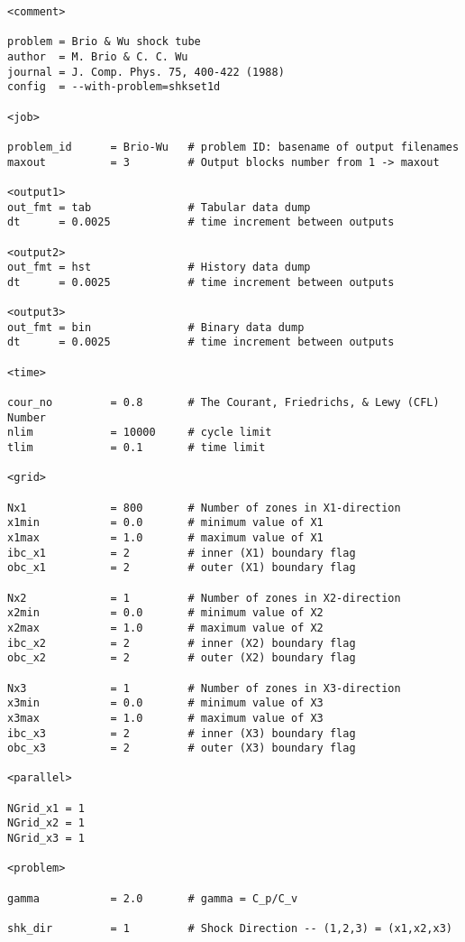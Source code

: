 \footnotesize
\begin{verbatim}
<comment>

problem = Brio & Wu shock tube
author  = M. Brio & C. C. Wu 
journal = J. Comp. Phys. 75, 400-422 (1988)
config  = --with-problem=shkset1d

<job>

problem_id      = Brio-Wu   # problem ID: basename of output filenames
maxout          = 3         # Output blocks number from 1 -> maxout

<output1>
out_fmt = tab               # Tabular data dump
dt      = 0.0025            # time increment between outputs

<output2>
out_fmt = hst               # History data dump
dt      = 0.0025            # time increment between outputs

<output3>
out_fmt = bin               # Binary data dump
dt      = 0.0025            # time increment between outputs

<time>

cour_no         = 0.8       # The Courant, Friedrichs, & Lewy (CFL) Number
nlim            = 10000     # cycle limit
tlim            = 0.1       # time limit

<grid>

Nx1             = 800       # Number of zones in X1-direction
x1min           = 0.0       # minimum value of X1
x1max           = 1.0       # maximum value of X1
ibc_x1          = 2         # inner (X1) boundary flag
obc_x1          = 2         # outer (X1) boundary flag

Nx2             = 1         # Number of zones in X2-direction
x2min           = 0.0       # minimum value of X2
x2max           = 1.0       # maximum value of X2
ibc_x2          = 2         # inner (X2) boundary flag
obc_x2          = 2         # outer (X2) boundary flag

Nx3             = 1         # Number of zones in X3-direction
x3min           = 0.0       # minimum value of X3
x3max           = 1.0       # maximum value of X3
ibc_x3          = 2         # inner (X3) boundary flag
obc_x3          = 2         # outer (X3) boundary flag

<parallel>

NGrid_x1 = 1
NGrid_x2 = 1
NGrid_x3 = 1

<problem>

gamma           = 2.0       # gamma = C_p/C_v

shk_dir         = 1         # Shock Direction -- (1,2,3) = (x1,x2,x3)


\end{verbatim}
